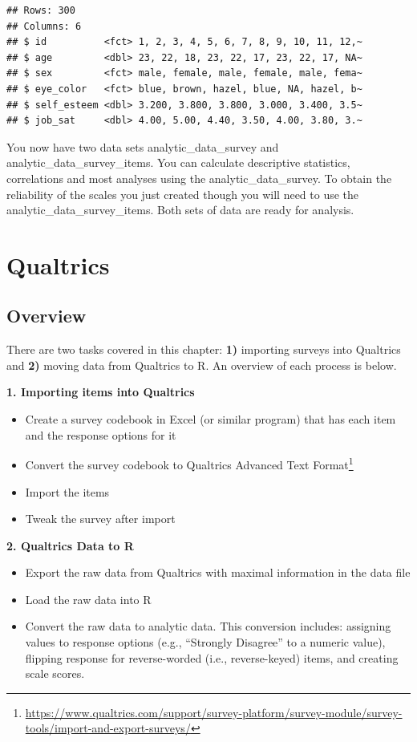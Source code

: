 \documentclass[
]{krantz}
\providecommand{\tightlist}{%
  \setlength{\itemsep}{0pt}\setlength{\parskip}{0pt}}
\renewcommand{\href}[2]{#2\footnote{\url{#1}}}
\begin{document}
\begin{verbatim}
## Rows: 300
## Columns: 6
## $ id          <fct> 1, 2, 3, 4, 5, 6, 7, 8, 9, 10, 11, 12,~
## $ age         <dbl> 23, 22, 18, 23, 22, 17, 23, 22, 17, NA~
## $ sex         <fct> male, female, male, female, male, fema~
## $ eye_color   <fct> blue, brown, hazel, blue, NA, hazel, b~
## $ self_esteem <dbl> 3.200, 3.800, 3.800, 3.000, 3.400, 3.5~
## $ job_sat     <dbl> 4.00, 5.00, 4.40, 3.50, 4.00, 3.80, 3.~
\end{verbatim}

You now have two data sets analytic\_data\_survey and analytic\_data\_survey\_items. You can calculate descriptive statistics, correlations and most analyses using the analytic\_data\_survey. To obtain the reliability of the scales you just created though you will need to use the analytic\_data\_survey\_items. Both sets of data are ready for analysis.

\hypertarget{qualtrics}{%
\chapter{Qualtrics}\label{qualtrics}}

\hypertarget{overview}{%
\section{Overview}\label{overview}}

There are two tasks covered in this chapter: \textbf{1)} importing surveys into Qualtrics and \textbf{2)} moving data from Qualtrics to R. An overview of each process is below.

\textbf{1. Importing items into Qualtrics}

\begin{itemize}
\tightlist
\item
  Create a survey codebook in Excel (or similar program) that has each item and the response options for it
\item
  Convert the survey codebook to Qualtrics \href{https://www.qualtrics.com/support/survey-platform/survey-module/survey-tools/import-and-export-surveys/}{Advanced Text Format}
\item
  Import the items
\item
  Tweak the survey after import
\end{itemize}

\textbf{2. Qualtrics Data to R}

\begin{itemize}
\tightlist
\item
  Export the raw data from Qualtrics with maximal information in the data file
\item
  Load the raw data into R
\item
  Convert the raw data to analytic data. This conversion includes: assigning values to response options (e.g., ``Strongly Disagree'' to a numeric value), flipping response for reverse-worded (i.e., reverse-keyed) items, and creating scale scores.
\end{itemize}
\end{document}
